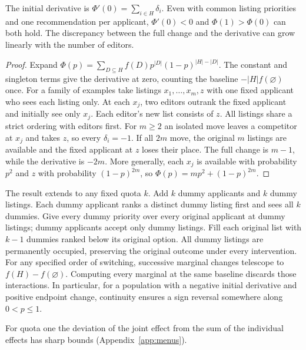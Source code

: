 \begin{proposition}\label{prop:rollout}
The initial derivative is $\Phi'(0)=\sum_{i\in H}\delta_i$. Even with common listing priorities and one recommendation per applicant, $\Phi'(0)<0$ and $\Phi(1)>\Phi(0)$ can both hold. The discrepancy between the full change and the derivative can grow linearly with the number of editors.
\end{proposition}
\begin{proof}
Expand $\Phi(p)=\sum_{D\subseteq H}f(D)p^{|D|}(1-p)^{|H|-|D|}$. The constant and singleton terms give the derivative at zero, counting the baseline $-|H|f(\varnothing)$ once. For a family of examples take listings $x_1,\ldots,x_m,z$ with one fixed applicant who sees each listing only. At each $x_j$, two editors outrank the fixed applicant and initially see only $x_j$. Each editor's new list consists of $z$. All listings share a strict ordering with editors first. For $m\ge 2$ an isolated move leaves a competitor at $x_j$ and takes $z$, so every $\delta_i=-1$. If all $2m$ move, the original $m$ listings are available and the fixed applicant at $z$ loses their place. The full change is $m-1$, while the derivative is $-2m$. More generally, each $x_j$ is available with probability $p^2$ and $z$ with probability $(1-p)^{2m}$, so $\Phi(p)=mp^2+(1-p)^{2m}$.
\end{proof}

The result extends to any fixed quota $k$. Add $k$ dummy applicants and $k$ dummy listings. Each dummy applicant ranks a distinct dummy listing first and sees all $k$ dummies. Give every dummy priority over every original applicant at dummy listings; dummy applicants accept only dummy listings. Fill each original list with $k-1$ dummies ranked below its original option. All dummy listings are permanently occupied, preserving the original outcome under every intervention. For any specified order of switching, successive marginal changes telescope to $f(H)-f(\varnothing)$. Computing every marginal at the same baseline discards those interactions. In particular, for a population with a negative initial derivative and positive endpoint change, continuity ensures a sign reversal somewhere along $0<p\le1$.

For quota one the deviation of the joint effect from the sum of the individual effects has sharp bounds (Appendix~\ref{app:menus}).
